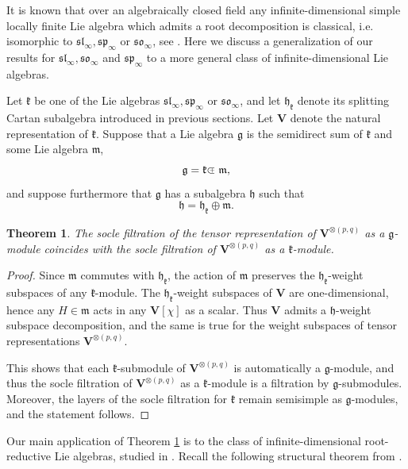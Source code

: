 \documentclass[12pt,reqno]{amsart}
\numberwithin{equation}{section}
\theoremstyle{plain}
\newtheorem{thm}{Theorem}[section]
\theoremstyle{definition}
\def\sl{\mathfrak{sl}}
\def\so{\mathfrak{so}}
\def\sp{\mathfrak{sp}}
\def\o{\otimes}
\def\g{\mathfrak g}
\def\h{\mathfrak h}
\def\VV{\mathbf V}
\def\cplus{\hbox{$\subset${\raise0.3ex\hbox{\kern -0.55em ${\scriptscriptstyle +}$}}\ }}
\begin{document}
It is known that over an algebraically closed field any infinite-dimensional simple
locally finite Lie algebra which admits a root decomposition is classical, i.e. isomorphic to
$\sl_\infty, \sp_\infty$ or $\so_\infty$, see \cite{PS,NS}. Here we discuss a
generalization of our results for $\sl_\infty,\so_\infty$ and $\sp_\infty$ to a more general
class of infinite-dimensional Lie algebras.

Let $\mathfrak k$ be one of the Lie algebras $\sl_\infty, \sp_\infty$ or $\so_\infty$, and let $\h_{\mathfrak k}$ denote its splitting Cartan subalgebra introduced in previous sections. Let $\VV$ denote the natural representation of $\mathfrak k$. Suppose that a Lie algebra $\g$ is the semidirect sum of $\mathfrak k$
and some Lie algebra $\mathfrak m$,
\begin{equation*}
    \g = \mathfrak k \cplus \mathfrak m,
\end{equation*}
and suppose furthermore that $\g$ has a subalgebra $\h$ such that
\begin{equation*}
    \h = \h_{\mathfrak k} \oplus \mathfrak m.
\end{equation*}

\begin{thm}\label{thm:generalization socle}
The socle filtration of the tensor representation of $\VV^{\o(p,q)}$ as a $\g$-module coincides with the socle  filtration of $\VV^{\o(p,q)}$ as a $\mathfrak k$-module.
\end{thm}

\begin{proof}
Since $\mathfrak m$ commutes with $\h_{\mathfrak k}$, the action of $\mathfrak m$ preserves the $\h_\mathfrak k$-weight subspaces of any $\mathfrak k$-module. The $\h_\mathfrak k$-weight subspaces of $\VV$ are one-dimensional, hence any $H \in \mathfrak m$ acts in any $\VV[\chi]$ as a scalar. Thus $\VV$ admits a $\h$-weight subspace decomposition, and the same is true for the weight subspaces of tensor representations $\VV^{\o(p,q)}$.

This shows that each $\mathfrak k$-submodule of $\VV^{\o(p,q)}$ is automatically a $\g$-module, and thus the socle filtration of $\VV^{\o(p,q)}$ as a $\mathfrak k$-module is a filtration by $\g$-submodules.
Moreover, the layers of the socle filtration for $\mathfrak k$ remain semisimple as $\g$-modules, and the statement follows.

\end{proof}


Our main application of Theorem \ref{thm:generalization socle} is to the class of
infinite-dimensional root-reductive Lie algebras, studied in
\cite{DP1,PS}. Recall the following structural theorem
from \cite{DP1}.
\end{document}
